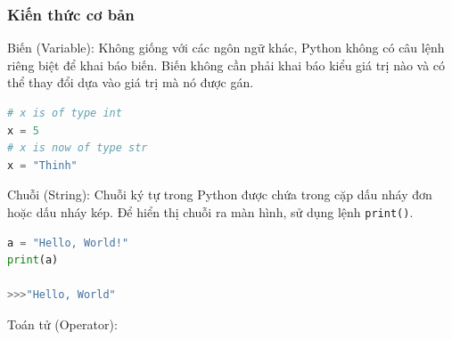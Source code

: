 \subsubsection{Kiến thức cơ bản}
Biến (Variable): Không giống với các ngôn ngữ khác, Python không có câu lệnh riêng biệt để khai báo biến. Biến không cần phải khai báo kiểu giá trị nào và có thể thay đổi dựa vào giá trị mà nó được gán.
\begin{lstlisting}[language=Python]
# x is of type int
x = 5
# x is now of type str
x = "Thinh"
\end{lstlisting}
\par
Chuỗi (String): Chuỗi ký tự trong Python được chứa trong cặp dấu nháy đơn hoặc dấu nháy kép. Để hiển thị chuỗi ra màn hình, sử dụng lệnh \texttt{print()}.
\begin{lstlisting}[language=Python]
a = "Hello, World!"
print(a)

>>>"Hello, World"
\end{lstlisting}
\par
Toán tử (Operator):
